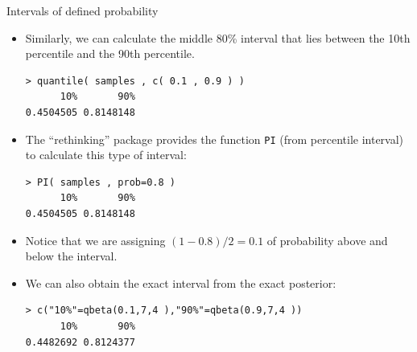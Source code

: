 \documentclass[handout]{beamer}
\begin{document}
\begin{frame}[fragile]{Intervals of defined probability}
\scriptsize{
\begin{itemize}

\item Similarly, we can calculate the middle 80\% interval that lies between the 10th percentile and the 90th percentile. 


\begin{verbatim}
> quantile( samples , c( 0.1 , 0.9 ) )
      10%       90% 
0.4504505 0.8148148 
\end{verbatim}



\item The ``rethinking'' package provides the function \verb+PI+ (from percentile interval) to calculate this type of interval:

\begin{verbatim}
> PI( samples , prob=0.8 )
      10%       90% 
0.4504505 0.8148148 
\end{verbatim}

\item Notice that we are assigning $(1-0.8)/2=0.1$ of probability above and below the interval.

\item We can also obtain the exact interval from the exact posterior:


\begin{verbatim}
> c("10%"=qbeta(0.1,7,4 ),"90%"=qbeta(0.9,7,4 ))
      10%       90% 
0.4482692 0.8124377 
\end{verbatim}

\end{itemize}


} 

\end{frame}
\end{document}
